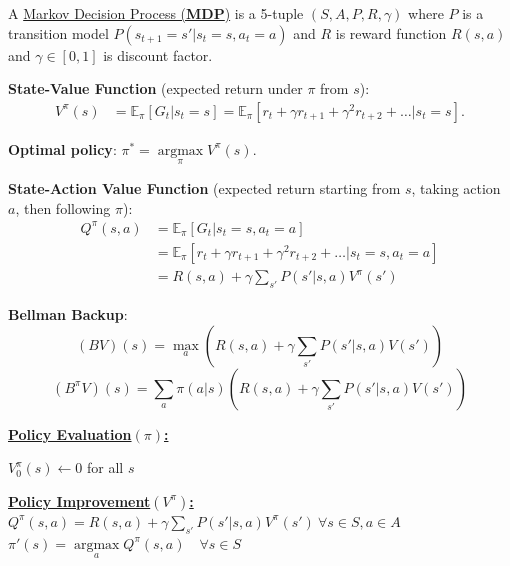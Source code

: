 \documentclass[10pt,landscape]{article}
\makeatletter
\renewcommand{\subsection}{\@startsection{subsection}{2}{0mm}%
                                {-1explus -.5ex minus -.2ex}%
                                {0.5ex plus .2ex}%
                                {\normalfont\normalsize\bfseries}}
\makeatother
\begin{document}
\begin{multicols}{3}
A \underline{Markov Decision Process (\textbf{MDP})} is a 5-tuple $(S, A, P, R, \gamma)$ where $P$ is a transition model $P(s_{t+1}=s'|s_t=s,a_t=a)$ and $R$ is reward function $R(s,a)$ and $\gamma\in[0,1]$ is discount factor. 

 
\textbf{State-Value Function} (expected return under $\pi$ from $s$):
\begin{align*}
V^{\pi}(s) &= \mathbb{E}_\pi[G_t | s_t = s]
= \mathbb{E}_\pi[r_t+\gamma r_{t+1}+\gamma^2r_{t+2}+\dots | s_t = s].
\end{align*}

\textbf{Optimal policy}: $\pi^*=\mathop{\arg\max}\limits_\pi V^{\pi}(s)$.

\textbf{State-Action Value Function} (expected return  starting from $s$, taking action $a$, then following $\pi$):
\begin{align*}
Q^{\pi}(s,a) &= \mathbb{E}_\pi[G_t | s_t = s, a_t=a]
\\&= \mathbb{E}_\pi[r_t+\gamma r_{t+1}+\gamma^2r_{t+2}+\dots| s_t = s, a_t=a ]
\\
&=R(s,a)+\gamma\sum_{s'}P(s'|s,a)V^\pi(s')
\end{align*}

\textbf{Bellman Backup}: 
$$(BV)(s)=\mathop{\max}\limits_a (R(s,a)+\gamma\sum\limits_{s'}P(s'|s,a)V(s'))$$
\vspace{-5mm}
$$(B^\pi V)(s)=\sum\limits_{a}\pi(a|s)\left(R(s,a)+\gamma\sum\limits_{s'}P(s'|s,a)V(s')\right)$$

\underline{\textbf{Policy Evaluation$(\pi)$:}}
\begin{algorithm}[H]
 $V^\pi_0(s) \gets 0$ for all $s$ \\
\end{algorithm}

\underline{\textbf{Policy Improvement$(V^\pi)$:}}
        $
        Q^{\pi}(s,a)  =R(s,a)+\gamma\sum_{s'}P(s'|s,a)V^\pi(s')
        \ \forall s\in S, a \in A
        $
\\
        $
        \pi'(s)  =\mathop{\arg\max}\limits_a Q^{\pi}(s,a)
        \quad \forall s\in S
        $


\end{multicols}
\end{document}
